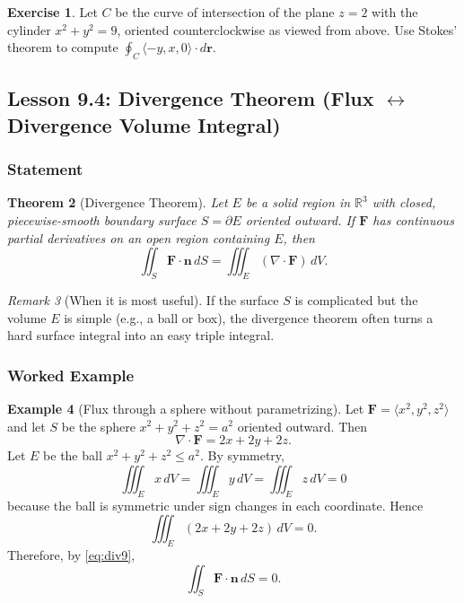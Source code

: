 \documentclass[12pt]{article}
\numberwithin{equation}{section}
\newcommand{\RR}{\mathbb{R}}
\newcommand{\vect}[1]{\boldsymbol{#1}}   %
\theoremstyle{plain}
\newtheorem{theorem}{Theorem}[section]
\theoremstyle{definition}
\newtheorem{example}[theorem]{Example}
\newtheorem{exercise}[theorem]{Exercise}
\theoremstyle{remark}
\newtheorem{remark}[theorem]{Remark}
\begin{document}
\begin{exercise}
Let $C$ be the curve of intersection of the plane $z=2$ with the cylinder $x^2+y^2=9$, oriented counterclockwise as viewed from above.
Use Stokes' theorem to compute $\displaystyle \oint_C \langle -y,x,0\rangle\cdot d\vect r$.
\end{exercise}

\subsection{Lesson 9.4: Divergence Theorem (Flux $\leftrightarrow$ Divergence Volume Integral)}

\subsubsection{Statement}

\begin{theorem}[Divergence Theorem]\label{thm:div9}
Let $E$ be a solid region in $\RR^3$ with closed, piecewise-smooth boundary surface $S=\partial E$ oriented outward.
If $\vect F$ has continuous partial derivatives on an open region containing $E$, then
\begin{equation}\label{eq:div9}
\iint_{S} \vect F\cdot \vect n\,dS
=
\iiint_{E} (\nabla\cdot \vect F)\,dV.
\end{equation}
\end{theorem}

\begin{remark}[When it is most useful]
If the surface $S$ is complicated but the volume $E$ is simple (e.g., a ball or box), the divergence theorem often turns a hard surface integral into an easy triple integral.
\end{remark}

\subsubsection{Worked Example}

\begin{example}[Flux through a sphere without parametrizing]\label{ex:div9-sphere}
Let $\vect F=\langle x^2, y^2, z^2\rangle$ and let $S$ be the sphere $x^2+y^2+z^2=a^2$ oriented outward.
Then
\[
\nabla\cdot \vect F = 2x+2y+2z.
\]
Let $E$ be the ball $x^2+y^2+z^2\le a^2$. By symmetry,
\[
\iiint_E x\,dV=\iiint_E y\,dV=\iiint_E z\,dV=0
\]
because the ball is symmetric under sign changes in each coordinate. Hence
\[
\iiint_E (2x+2y+2z)\,dV=0.
\]
Therefore, by \cref{eq:div9},
\[
\iint_S \vect F\cdot \vect n\,dS=0.
\]
\end{example}
\end{document}
